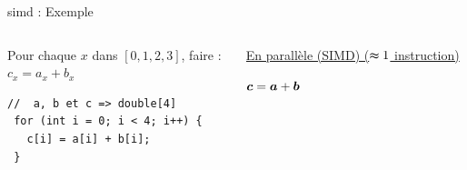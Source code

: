 \documentclass[../main.tex]{subfiles}
\begin{document}
\begin{frame}[fragile]{\acrshort{simd} : Exemple}
\begin{columns}
\begin{column}{.5\linewidth}
\begin{overlayarea}{\linewidth}{.4\textheight}
        Pour chaque $x$ dans $[0,1,2,3]$, faire :\\
        \hspace{2 em} $c_x = a_x + b_x$

        \begin{lstlisting}[title={Sequentiellement en C},style=cstyle,basicstyle=\scriptsize]
 //  a, b et c => double[4]
 for (int i = 0; i < 4; i++) {
   c[i] = a[i] + b[i]; 
 }\end{lstlisting}

      \end{overlayarea}
    \end{column}
    \begin{column}{.45\linewidth}
      \begin{overlayarea}{\linewidth}{.4\textheight}
        \underline{En parallèle (SIMD) ($\thickapprox 1$ instruction)} \vspace{1 em}

        $\bm{c} = \bm{a} + \bm{b}$ \\
        \phantom{$c_x$}


\end{overlayarea}
\end{column}
\end{columns}
\end{frame}
\end{document}
